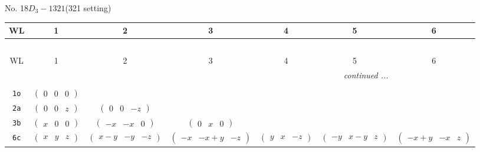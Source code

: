 \documentclass[fleqn,9pt,landscape]{jsarticle}
\begin{document}
\newpage
No. 18\quad$D_{3}-1$\quad$321$\quad(321 setting)\quad[ trigonal ]
\begin{center}
\renewcommand{\arraystretch}{1.2}
\begin{longtable}{ccccccc}
 \hline \hline
WL & 1 & 2 & 3 & 4 & 5 & 6 \\ \hline \endfirsthead

\multicolumn{6}{l}{\tablename\ \thetable{}} \\
 \hline \hline
WL & 1 & 2 & 3 & 4 & 5 & 6 \\ \hline \endhead

 \hline \hline
\multicolumn{6}{r}{\footnotesize\it continued ...} \\ \endfoot

 \hline \hline
\multicolumn{6}{r}{} \\ \endlastfoot

{\tt 1o} & $ \begin{pmatrix} 0 & 0 & 0 \end{pmatrix} $ & $  $ & $  $ & $  $ & $  $ & $  $ \\ \hline
{\tt 2a} & $ \begin{pmatrix} 0 & 0 & z \end{pmatrix} $ & $ \begin{pmatrix} 0 & 0 & - z \end{pmatrix} $ & $  $ & $  $ & $  $ & $  $ \\ \hline
{\tt 3b} & $ \begin{pmatrix} x & 0 & 0 \end{pmatrix} $ & $ \begin{pmatrix} - x & - x & 0 \end{pmatrix} $ & $ \begin{pmatrix} 0 & x & 0 \end{pmatrix} $ & $  $ & $  $ & $  $ \\ \hline
{\tt 6c} & $ \begin{pmatrix} x & y & z \end{pmatrix} $ & $ \begin{pmatrix} x - y & - y & - z \end{pmatrix} $ & $ \begin{pmatrix} - x & - x + y & - z \end{pmatrix} $ & $ \begin{pmatrix} y & x & - z \end{pmatrix} $ & $ \begin{pmatrix} - y & x - y & z \end{pmatrix} $ & $ \begin{pmatrix} - x + y & - x & z \end{pmatrix} $ \\
\end{longtable}
\end{center}
\end{document}
